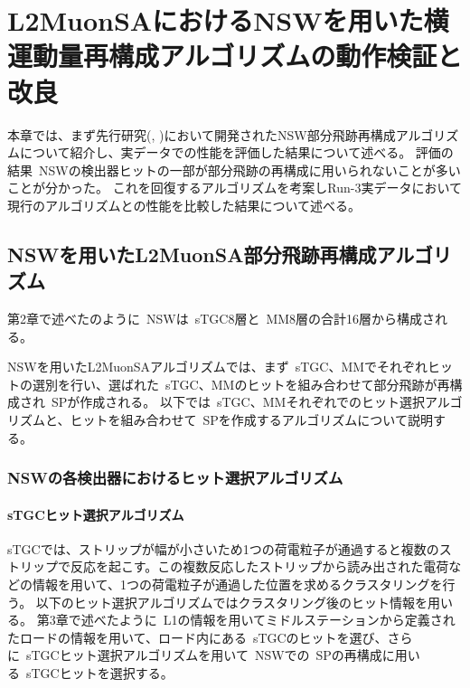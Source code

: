 \chapter{L2MuonSAにおけるNSWを用いた横運動量再構成アルゴリズムの動作検証と改良}\label{chapter5}


本章では、まず先行研究(\cite{article:kumaoka}, \cite{article:noguchi})において開発されたNSW部分飛跡再構成アルゴリズムについて紹介し、実データでの性能を評価した結果について述べる。
評価の結果~NSWの検出器ヒットの一部が部分飛跡の再構成に用いられないことが多いことが分かった。
これを回復するアルゴリズムを考案しRun-3実データにおいて現行のアルゴリズムとの性能を比較した結果について述べる。

\newpage

\section{NSWを用いたL2MuonSA部分飛跡再構成アルゴリズム}\label{chapter5-1}
第2章で述べたのように~NSWは~sTGC8層と~MM8層の合計16層から構成される。

NSWを用いたL2MuonSAアルゴリズムでは、まず~sTGC、MMでそれぞれヒットの選別を行い、選ばれた~sTGC、MMのヒットを組み合わせて部分飛跡が再構成され~SPが作成される。
以下では~sTGC、MMそれぞれでのヒット選択アルゴリズムと、ヒットを組み合わせて~SPを作成するアルゴリズムについて説明する。

\subsection{NSWの各検出器におけるヒット選択アルゴリズム}\label{chapter5-1-1}
\subsubsection{sTGCヒット選択アルゴリズム}
sTGCでは、ストリップが幅が小さいため1つの荷電粒子が通過すると複数のストリップで反応を起こす。この複数反応したストリップから読み出された電荷などの情報を用いて、1つの荷電粒子が通過した位置を求めるクラスタリングを行う。
以下のヒット選択アルゴリズムではクラスタリング後のヒット情報を用いる。
第3章で述べたように~L1の情報を用いてミドルステーションから定義されたロードの情報を用いて、ロード内にある~sTGCのヒットを選び、さらに~sTGCヒット選択アルゴリズムを用いて~NSWでの~SPの再構成に用いる~sTGCヒットを選択する。

